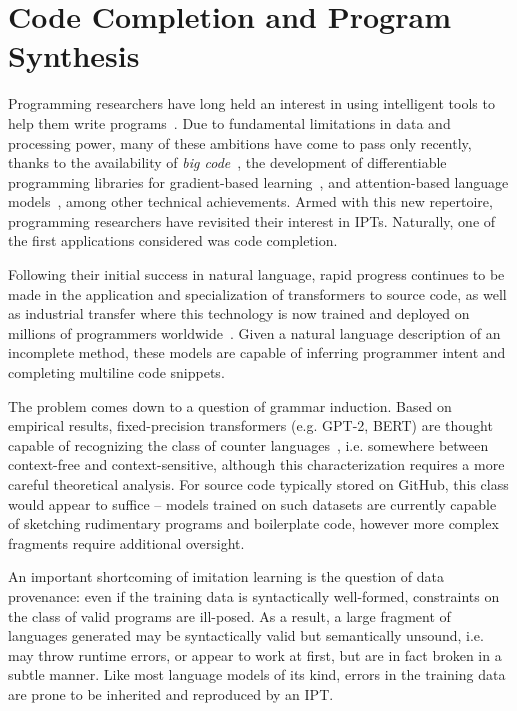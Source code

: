 \documentclass[12pt]{article}
\begin{document}
\pagebreak\section{Code Completion and Program Synthesis}\label{sec:autocompletion}

Programming researchers have long held an interest in using intelligent tools to help them write programs~\cite{bras1993artificial}. Due to fundamental limitations in data and processing power, many of these ambitions have come to pass only recently, thanks to the availability of \textit{big code}~\cite{allamanis2018survey}, the development of differentiable programming libraries for gradient-based learning~\cite{baydin2018automatic}, and attention-based language models~\cite{vaswani2017attention}, among other technical achievements. Armed with this new repertoire, programming researchers have revisited their interest in IPTs. Naturally, one of the first applications considered was code completion.

Following their initial success in natural language, rapid progress continues to be made in the application and specialization of transformers to source code, as well as industrial transfer where this technology is now trained and deployed on millions of programmers worldwide~\cite{chen2021evaluating}. Given a natural language description of an incomplete method, these models are capable of inferring programmer intent and completing multiline code snippets.

The problem comes down to a question of grammar induction. Based on empirical results, fixed-precision transformers (e.g. GPT-2, BERT) are thought capable of recognizing the class of counter languages~\cite{bhattamishra2020ability}, i.e. somewhere between context-free and context-sensitive, although this characterization requires a more careful theoretical analysis. For source code typically stored on GitHub, this class would appear to suffice -- models trained on such datasets are currently capable of sketching rudimentary programs and boilerplate code, however more complex fragments require additional oversight.

An important shortcoming of imitation learning is the question of data provenance: even if the training data is syntactically well-formed, constraints on the class of valid programs are ill-posed. As a result, a large fragment of languages generated may be syntactically valid but semantically unsound, i.e. may throw runtime errors, or appear to work at first, but are in fact broken in a subtle manner. Like most language models of its kind, errors in the training data are prone to be inherited and reproduced by an IPT.
\end{document}
